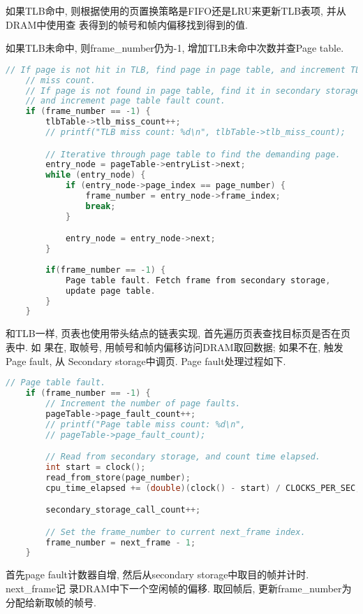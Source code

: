 如果TLB命中, 则根据使用的页置换策略是FIFO还是LRU来更新TLB表项, 并从DRAM中使用查
表得到的帧号和帧内偏移找到得到的值.\par

如果TLB未命中, 则frame\_number仍为-1, 增加TLB未命中次数并查Page table.
\begin{lstlisting}[language=c++]
    // If page is not hit in TLB, find page in page table, and increment TLB
    // miss count.
    // If page is not found in page table, find it in secondary storage DRAM,
    // and increment page table fault count.
    if (frame_number == -1) {
        tlbTable->tlb_miss_count++;
        // printf("TLB miss count: %d\n", tlbTable->tlb_miss_count);

        // Iterative through page table to find the demanding page.
        entry_node = pageTable->entryList->next;
        while (entry_node) {
            if (entry_node->page_index == page_number) {
                frame_number = entry_node->frame_index;
                break;
            }

            entry_node = entry_node->next;
        }
        
        if(frame_number == -1) {
            Page table fault. Fetch frame from secondary storage,
            update page table.
        }
    }
\end{lstlisting}
和TLB一样, 页表也使用带头结点的链表实现, 首先遍历页表查找目标页是否在页表中. 如
果在, 取帧号, 用帧号和帧内偏移访问DRAM取回数据; 如果不在, 触发Page fault, 从
Secondary storage中调页. Page fault处理过程如下.
\begin{lstlisting}[language=c++]
    // Page table fault.
    if (frame_number == -1) {
        // Increment the number of page faults.
        pageTable->page_fault_count++;
        // printf("Page table miss count: %d\n",
        // pageTable->page_fault_count);

        // Read from secondary storage, and count time elapsed.
        int start = clock();
        read_from_store(page_number);
        cpu_time_elapsed += (double)(clock() - start) / CLOCKS_PER_SEC;

        secondary_storage_call_count++;

        // Set the frame_number to current next_frame index.
        frame_number = next_frame - 1;
    }

\end{lstlisting}
首先page fault计数器自增, 然后从secondary storage中取目的帧并计时. next\_frame记
录DRAM中下一个空闲帧的偏移. 取回帧后, 更新frame\_number为分配给新取帧的帧号.

